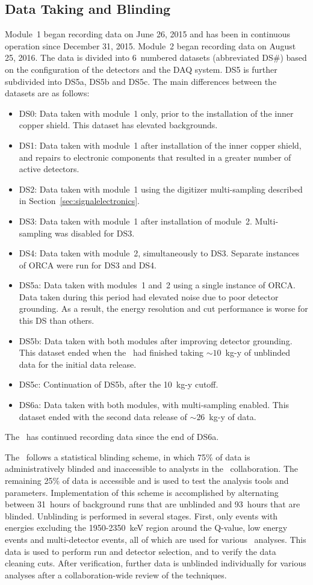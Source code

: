 \documentclass[/main.tex]{subfiles}
\begin{document}
\subsection{Data Taking and Blinding}
Module~1 began recording data on June 26, 2015 and has been in continuous operation since December 31, 2015.
Module~2 began recording data on August 25, 2016.
The data is divided into 6~numbered datasets (abbreviated DS\#) based on the configuration of the detectors and the DAQ system.
DS5 is further subdivided into DS5a, DS5b and DS5c.
The main differences between the datasets are as follows:
\begin{itemize}
\item DS0: Data taken with module~1 only, prior to the installation of the inner copper shield. This dataset has elevated backgrounds.
\item DS1: Data taken with module~1 after installation of the inner copper shield, and repairs to electronic components that resulted in a greater number of active detectors.
\item DS2: Data taken with module~1 using the digitizer multi-sampling described in Section~\ref{sec:signalelectronics}.
\item DS3: Data taken with module~1 after installation of module~2. Multi-sampling was disabled for DS3.
\item DS4: Data taken with module~2, simultaneously to DS3. Separate instances of ORCA were run for DS3 and DS4.
\item DS5a: Data taken with modules~1 and~2 using a single instance of ORCA. Data taken during this period had elevated noise due to poor detector grounding. As a result, the energy resolution and cut performance is worse for this DS than others.
\item DS5b: Data taken with both modules after improving detector grounding. This dataset ended when the \MJD\ had finished taking ${\sim}10$~kg-y of unblinded data for the initial data release.
\item DS5c: Continuation of DS5b, after the 10~kg-y cutoff.
\item DS6a: Data taken with both modules, with multi-sampling enabled. This dataset ended with the second data release of ${\sim}26$~kg-y of data.
\end{itemize}
The \MJD\ has continued recording data since the end of DS6a.

The \MJD\ follows a statistical blinding scheme, in which 75\% of data is administratively blinded and inaccessible to analysts in the \MJ\ collaboration.
The remaining 25\% of data is accessible and is used to test the analysis tools and parameters.
Implementation of this scheme is accomplished by alternating between 31~hours of background runs that are unblinded and 93~hours that are blinded.
Unblinding is performed in several stages.
First, only events with energies excluding the 1950-2350~keV region around the Q-value, low energy events and multi-detector events, all of which are used for various \MJD\ analyses.
This data is used to perform run and detector selection, and to verify the data cleaning cuts.
After verification, further data is unblinded individually for various analyses after a collaboration-wide review of the techniques.
\end{document}
